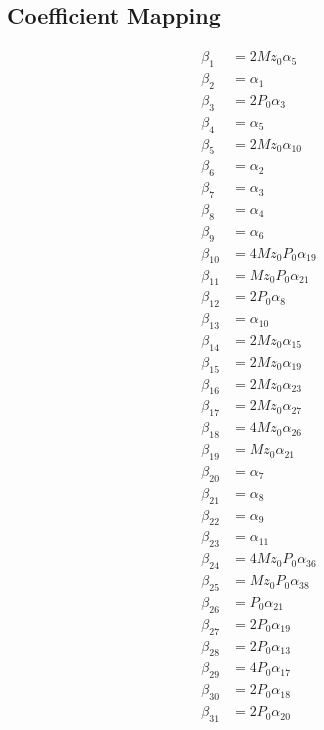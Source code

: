 \documentclass{article}
\begin{document}
\subsection*{Coefficient Mapping}

\begin{align*}
\beta_{1} &= 2 Mz_{0} \alpha_{5} \\
\beta_{2} &= \alpha_{1} \\
\beta_{3} &= 2 P_{0} \alpha_{3} \\
\beta_{4} &= \alpha_{5} \\
\beta_{5} &= 2 Mz_{0} \alpha_{10} \\
\beta_{6} &= \alpha_{2} \\
\beta_{7} &= \alpha_{3} \\
\beta_{8} &= \alpha_{4} \\
\beta_{9} &= \alpha_{6} \\
\beta_{10} &= 4 Mz_{0} P_{0} \alpha_{19} \\
\beta_{11} &= Mz_{0} P_{0} \alpha_{21} \\
\beta_{12} &= 2 P_{0} \alpha_{8} \\
\beta_{13} &= \alpha_{10} \\
\beta_{14} &= 2 Mz_{0} \alpha_{15} \\
\beta_{15} &= 2 Mz_{0} \alpha_{19} \\
\beta_{16} &= 2 Mz_{0} \alpha_{23} \\
\beta_{17} &= 2 Mz_{0} \alpha_{27} \\
\beta_{18} &= 4 Mz_{0} \alpha_{26} \\
\beta_{19} &= Mz_{0} \alpha_{21} \\
\beta_{20} &= \alpha_{7} \\
\beta_{21} &= \alpha_{8} \\
\beta_{22} &= \alpha_{9} \\
\beta_{23} &= \alpha_{11} \\
\beta_{24} &= 4 Mz_{0} P_{0} \alpha_{36} \\
\beta_{25} &= Mz_{0} P_{0} \alpha_{38} \\
\beta_{26} &= P_{0} \alpha_{21} \\
\beta_{27} &= 2 P_{0} \alpha_{19} \\
\beta_{28} &= 2 P_{0} \alpha_{13} \\
\beta_{29} &= 4 P_{0} \alpha_{17} \\
\beta_{30} &= 2 P_{0} \alpha_{18} \\
\beta_{31} &= 2 P_{0} \alpha_{20} \\
\end{align*}
\end{document}
